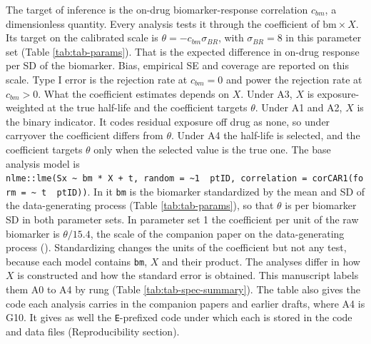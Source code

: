 \documentclass[
  11pt,
]{article}
\newcounter{none} %
\begin{document}
The target of inference is the on-drug biomarker-response
correlation \(c_{bm}\), a dimensionless quantity. Every analysis tests
it through the coefficient of \(\text{bm} \times X\). Its target on the
calibrated scale is \(\theta = -c_{bm}\sigma_{BR}\), with
\(\sigma_{BR} = 8\) in this parameter set (Table \ref{tab:tab-params}).
That is the expected difference in on-drug response per SD of the
biomarker. Bias, empirical SE and coverage are reported on this
scale. Type I error is the rejection rate at \(c_{bm} = 0\) and power
the rejection rate at \(c_{bm} > 0\). What the coefficient estimates
depends on \(X\). Under A3, \(X\) is exposure-weighted at the true
half-life and the coefficient targets \(\theta\). Under A1 and A2, \(X\)
is the binary indicator. It codes residual exposure off drug as none,
so under carryover the coefficient differs from \(\theta\). Under A4 the
half-life is selected, and the coefficient targets \(\theta\) only when
the selected value is the true one. The base analysis model is
\texttt{nlme::lme(Sx\ \textasciitilde{}\ bm\ *\ X\ +\ t,\ random\ =\ \textasciitilde{}1\ \textbar{}\ ptID,\ correlation\ =\ corCAR1(form\ =\ \textasciitilde{}\ t\ \textbar{}\ ptID))}.
In it \texttt{bm} is the biomarker standardized by the mean and SD of the
data-generating process (Table \ref{tab:tab-params}), so that
\(\theta\) is per biomarker SD in both parameter sets. In parameter set
1 the coefficient per unit of the raw biomarker is \(\theta / 15.4\),
the scale of the companion paper on the data-generating process
(). Standardizing changes the units
of the coefficient but not any test, because each model contains
\texttt{bm}, \(X\) and their product.
The analyses differ in how \(X\) is constructed and how the standard
error is obtained. This manuscript labels them A0 to A4 by rung (Table
\ref{tab:tab-spec-summary}). The table also gives the code each
analysis carries in the companion papers and earlier drafts, where A4
is G10. It gives as well the \texttt{E}-prefixed code under which each is
stored in the code and data files (Reproducibility section).
\end{document}
